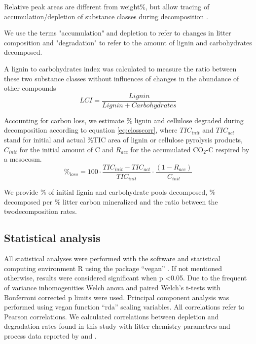 \documentclass[authoryear,preprint,review,12pt]{elsarticle}
\begin{document}


Relative peak areas are different from weight\%, but allow tracing of accumulation/depletion of substance classes during decomposition \citep{Schellekens2009}.

We use the terms "accumulation" and depletion to refer to changes in litter composition and "degradation" to refer to the amount of lignin and carbohydrates decomposed.

A lignin to carbohydrates index was calculated to measure the ratio between these two substance classes without influences of changes in the abundance of other compounds
\begin{equation}
 LCI=\frac{Lignin}{Lignin + Carbohydrates}
\end{equation}

Accounting for carbon loss, we estimate \% lignin and cellulose degraded during decomposition according to equation \ref{eq:closscorr}, where \emph{$TIC_{init}$} and \emph{$TIC_{act}$} stand for initial and actual \%TIC area of lignin or cellulose pyrolysis products, \emph{$C_{init}$} for the initial amount of C and \emph{$R_{acc}$} for the accumulated CO$_2$-C respired by a mesocosm.
\begin{equation}
 \%_{loss} = 100\cdot\frac{TIC_{init}-TIC_{act}}{TIC_{init}}\cdot\frac{\left ( 1-R_{acc}\right ) }{C_{init}}
 \label{eq:closscorr}
\end{equation}

We provide \% of initial lignin and carbohydrate pools decomposed, \% decomposed per \% litter carbon mineralized and the ratio between the twodecomposition rates.

\subsection{Statistical analysis}
All statistical analyses were performed with the software and statistical computing environment R using the package ``vegan'' \citep{Oksanen2011}. If not mentioned otherwise, results were considered significant when p \textless 0.05. Due to the frequent of variance inhomogenities Welch anova and paired Welch's t-tests with Bonferroni corrected p limits were used. Principal component analysis was performed using vegan function ``rda'' scaling variables. All correlations refer to Pearson correlations. We calculated correlations between depletion and degradation rates found in this study with litter chemistry parametres and process data reported by \cite{Mooshammer2011} and \cite{Leitner2011}.
\end{document}
